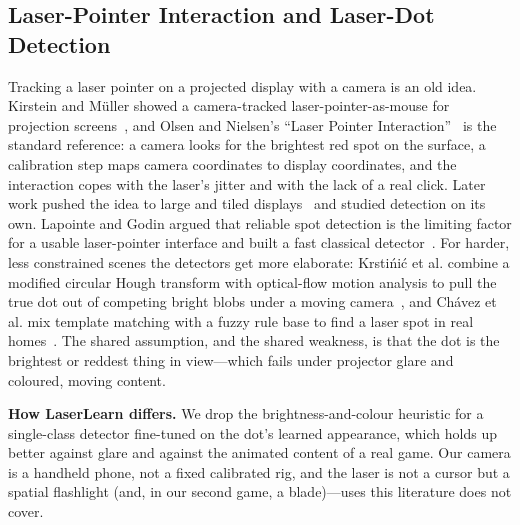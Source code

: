 \documentclass[conference]{IEEEtran}
\begin{document}
\subsection{Laser-Pointer Interaction and Laser-Dot Detection}
Tracking a laser pointer on a projected display with a camera is an old idea.
Kirstein and M\"uller showed a camera-tracked laser-pointer-as-mouse for
projection screens~\cite{kirstein1998}, and Olsen and Nielsen's ``Laser Pointer
Interaction''~\cite{olsen2001} is the standard reference: a camera looks for the
brightest red spot on the surface, a calibration step maps camera coordinates to
display coordinates, and the interaction copes with the laser's jitter and with
the lack of a real click. Later work pushed the idea to large and tiled
displays~\cite{ahlborn2005} and studied detection on its own. Lapointe and Godin
argued that reliable spot detection is the limiting factor for a usable
laser-pointer interface and built a fast classical detector~\cite{lapointe2005}.
For harder, less constrained scenes the detectors get more elaborate:
Krsti\'ni\'c et al. combine a modified circular Hough transform with optical-flow
motion analysis to pull the true dot out of competing bright blobs under a moving
camera~\cite{krstinic2014}, and Ch\'avez et al. mix template matching with a fuzzy
rule base to find a laser spot in real homes~\cite{chavez2012}. The shared
assumption, and the shared weakness, is that the dot is the brightest or reddest
thing in view---which fails under projector glare and coloured, moving content.

\textbf{How LaserLearn differs.} We drop the brightness-and-colour heuristic for a
single-class detector fine-tuned on the dot's learned appearance, which holds up
better against glare and against the animated content of a real game. Our camera
is a handheld phone, not a fixed calibrated rig, and the laser is not a cursor but
a spatial flashlight (and, in our second game, a blade)---uses this literature
does not cover.

\end{document}
